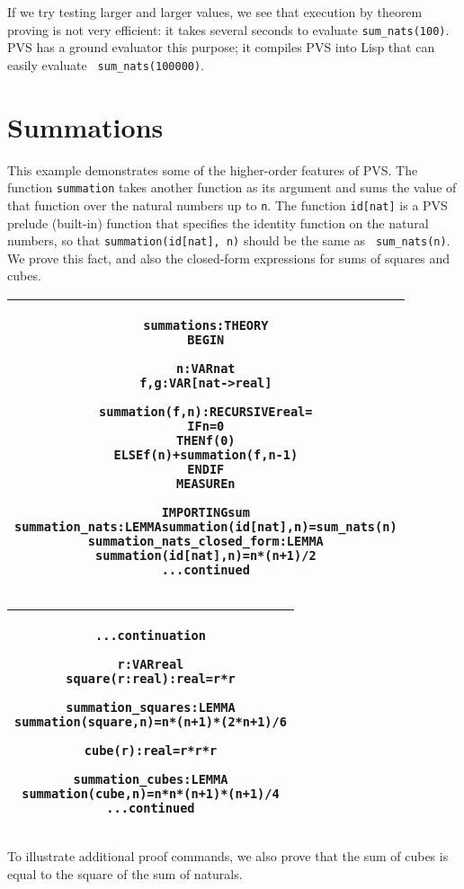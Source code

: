 \documentclass[11pt,twoside]{article}
\makeatletter
\def\sessionsize{\small}
\newlength{\hsbw}
\newenvironment{session}{\begin{flushleft}
  \def\baselinestretch{1}
 \setlength{\hsbw}{\linewidth}
 \addtolength{\hsbw}{-\arrayrulewidth}
 \addtolength{\hsbw}{-\tabcolsep}
 \begin{tabular}{@{}|c@{}|@{}}\hline 
 \begin{minipage}[b]{\hsbw}
 \begingroup\sessionsize\vspace*{1.2ex}\begin{alltt}}{\end{alltt}\endgroup\end{minipage}\\ \hline
 \end{tabular}
 \end{flushleft}}
\makeatother
\begin{document}
If we try testing larger and larger values, we see that execution by
theorem proving is not very efficient: it takes several seconds to
evaluate {\tt sum\_nats(100)}.  PVS has a ground evaluator this
purpose; it compiles PVS into Lisp that can easily evaluate {\tt
sum\_nats(100000)}.

\section{Summations}

This example demonstrates some of the higher-order features
of PVS.   The function {\tt summation} takes another function as its
argument and sums the value of that function over the natural numbers
up to {\tt n}.  The function {\tt id[nat]} is a PVS prelude (built-in)
function that specifies the identity function on the natural numbers,
so that {\tt summation(id[nat], n)} should be the same as {\tt
sum\_nats(n)}.  We prove this fact, and also the closed-form
expressions for sums of squares and cubes.

\begin{session}
summations: THEORY
  BEGIN

   n: VAR nat
   f, g: VAR [nat -> real]

   summation(f, n): RECURSIVE real =
    IF n = 0
      THEN f(0)
      ELSE f(n) + summation(f, n - 1)
    ENDIF
   MEASURE n

  IMPORTING sum
  summation_nats: LEMMA  summation(id[nat], n) = sum_nats(n)
  summation_nats_closed_form: LEMMA
                         summation(id[nat], n) = n*(n+1)/2
...continued
\end{session}
\begin{session}
...continuation

  r: VAR real
  square(r: real): real = r*r

  summation_squares: LEMMA
    summation(square, n) = n * (n + 1) * (2*n + 1) / 6

  cube(r): real = r*r*r 

  summation_cubes: LEMMA
    summation(cube, n) = n*n*(n+1)*(n+1)/4
...continued
\end{session}
To illustrate additional proof commands, we also prove that the sum of
cubes is equal to the square of the sum of naturals.
\end{document}
